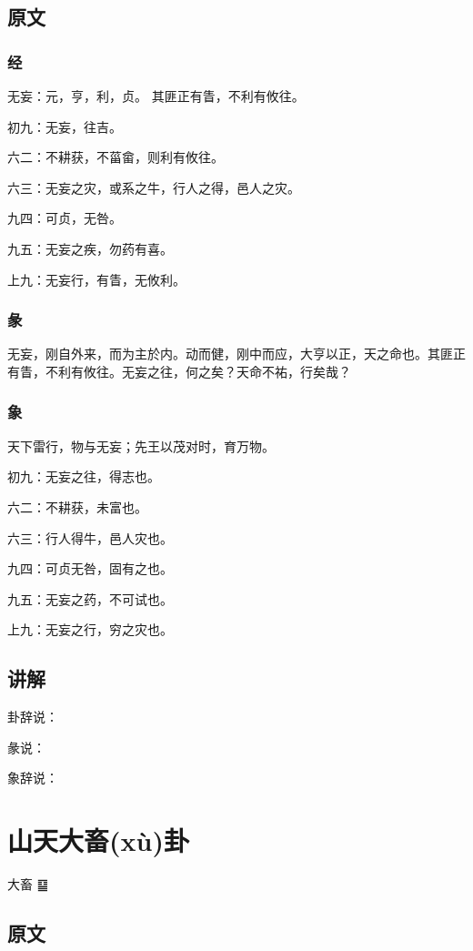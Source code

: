 \documentclass[12pt,oneside]{book}
\begin{document}
\section{原文}
\subsection{经}
无妄：元，亨，利，贞。 其匪正有眚，不利有攸往。

初九：无妄，往吉。

六二：不耕获，不菑畲，则利有攸往。

六三：无妄之灾，或系之牛，行人之得，邑人之灾。

九四：可贞，无咎。

九五：无妄之疾，勿药有喜。

上九：无妄行，有眚，无攸利。

\subsection{彖}
无妄，刚自外来，而为主於内。动而健，刚中而应，大亨以正，天之命也。其匪正有眚，不利有攸往。无妄之往，何之矣？天命不祐，行矣哉？
\subsection{象}
天下雷行，物与无妄；先王以茂对时，育万物。

初九：无妄之往，得志也。

六二：不耕获，未富也。

六三：行人得牛，邑人灾也。

九四：可贞无咎，固有之也。

九五：无妄之药，不可试也。

上九：无妄之行，穷之灾也。

\section{讲解}
卦辞说：

彖说：

象辞说：


\chapter{山天大畜(xù)卦}
大畜 {\Large ䷙}

\section{原文}
\end{document}
